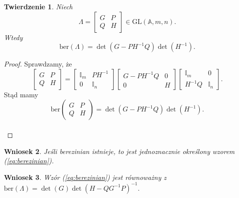 \documentclass[11pt,a4paper]{report}
\newtheorem{theorem}{Twierdzenie}[section]
\newtheorem{corollary}[theorem]{Wniosek}
\theoremstyle{definition}
\newcommand{\ber}{\mathrm{ber}}
\newcommand{\I}{\mathbb{I}}
\begin{document}
\begin{theorem}
\label{thm:ber_equation}
 Niech $$\Lambda = \begin{bmatrix}
      G & P \\
      Q & H
     \end{bmatrix} \in \mathrm{GL}(\mathbb{A},m,n).$$ 
     Wtedy
     \begin{equation}
     \label{eq:berezinian}
      \ber (\Lambda) = \det(G-PH^{-1}Q)\det(H^{-1}).
     \end{equation}
\end{theorem}

\begin{proof}
Sprawdzamy, że
\begin{equation}
\label{eq:smatrix_decomposition}
 \begin{bmatrix}
      G & P \\
      Q & H
     \end{bmatrix}
     =
     \begin{bmatrix}
      \I_m & PH^{-1} \\
      0 & \I_n
     \end{bmatrix}
     \begin{bmatrix}
      G-PH^{-1}Q & 0 \\
      0 & H
     \end{bmatrix}
     \begin{bmatrix}
      \I_m & 0 \\
      H^{-1}Q & \I_n
     \end{bmatrix}\!\!.
\end{equation}
Stąd mamy $$\ber \left( \begin{matrix}
      G & P \\
      Q & H
     \end{matrix} \right) = \det(G-PH^{-1}Q) \det(H^{-1}).$$\\[-24pt]
\end{proof}

\begin{corollary}
 Jeśli berezinian istnieje, to jest jednoznacznie określony wzorem (\ref{eq:berezinian}).
\end{corollary}

\begin{corollary}
 Wzór (\ref{eq:berezinian}) jest równoważny z $\ber (\Lambda) = \det(G)\det(H-QG^{-1}P)^{-1}.$
\end{corollary}
\end{document}

